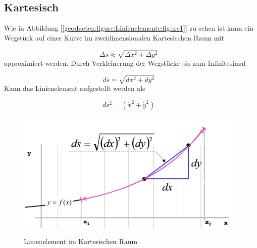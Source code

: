 %
%
%
%
\subsection{Kartesisch\label{geodaeten:section:Linienelemente:Kartesisch}}

Wie in Abbildung [\ref{geodaeten:figure:Linienelemente:figure1}] zu sehen ist kann ein Wegstück auf einer Kurve im zweidimensionalen Kartesischen Raum mit

\begin{equation}
	\Delta s \approx \sqrt{\Delta x^2 + \Delta y^2}
\end{equation}
approximiert werden.
Durch Verkleinerung der Wegstücke bis zum Infinitesimal 

\begin{equation}
	d s = \sqrt{d x^2 + d y^2}
\end{equation}
Kann das Linienelement aufgestellt werden als

\begin{equation}
 	ds^2 = \left(\dot{x}^2 +\dot{y}^2\right) %
 	\label{geodaeten:equation:Linienelemente:Kartesisch:equation1}
\end{equation}



\begin{figure}
	\centering
	\includegraphics[width=0.7\linewidth]{papers/geodaeten/Abbildungen/Linienelemente/LinKartes1}
	\caption{Linienelement im Kartesischen Raum}
	\label{geodaeten:figure:Linienelemente:Kartesisch:figure1}
	\cite{geodaeten:kartesisch}
\end{figure}
